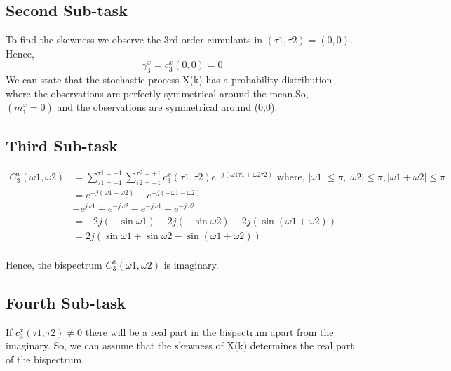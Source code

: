 \documentclass[a4paper]{article}
\begin{document}
\subsection{Second Sub-task}
To find the skewness we observe the 3rd order cumulants in \((\tau1,\tau2)=(0,0)\).\\Hence,
\[\gamma_3^x=c_3^x(0,0)=0\]
We can state that the stochastic process X(k) has a probability distribution where the observations are perfectly symmetrical around the mean.So, \((m_1^x=0)\) and the observations are symmetrical around (0,0).

\subsection{Third Sub-task}
\begin{equation*}
\begin{aligned}
C_3^x(\omega1,\omega2) &= \sum_{\tau1=-1}^{\tau1=+1}\sum_{\tau2=-1}^{\tau2=+1}c_3^x(\tau1,\tau2)
e^{-j(\omega1\tau1+\omega2\tau2)} \text{ where, } |\omega1|\leq\pi, |\omega2|\leq\pi,
|\omega1+\omega2|\leq\pi \\
&= e^{-j(\omega1+\omega2)}-e^{-j(-\omega1-\omega2)}\\
&+ e^{j\omega1} + e^{-j\omega2} - e^{-j\omega1} - e^{-j\omega2}\\
&= -2j(-\sin{\omega1}) - 2j(-\sin{\omega2}) - 2j(\sin{(\omega1+\omega2)})\\
&= 2j(\sin{\omega1}+\sin{\omega2}-\sin{(\omega1+\omega2)})
\end{aligned}
\end{equation*} \\
Hence, the bispectrum \(C_3^x(\omega1,\omega2)\) is imaginary.

\subsection{Fourth Sub-task}
If \(c_3^x(\tau1,\tau2)\neq0\) there will be a real part in the bispectrum apart from the imaginary.
So, we can assume that the skewness of X(k) determines the real part of the bispectrum.
\end{document}
